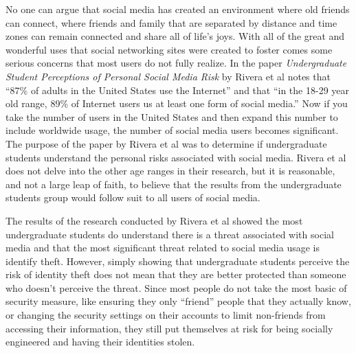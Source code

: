 \documentclass[conference]{IEEEtran}
\begin{document}
No one can argue that social media has created an environment where old friends can connect, where friends and family that are separated by distance and time zones can remain connected and share all of life’s joys. With all of the great and wonderful uses that social networking sites were created to foster comes some serious concerns that most users do not fully realize. In the paper \textit{Undergraduate Student Perceptions of Personal Social Media Risk} by Rivera et al notes that “87\% of adults in the United States use the Internet” and that “in the 18-29 year old range, 89\% of Internet users us at least one form of social media\cite{Rivera:2015:USP:2885990.2885998}.”  Now if you take the number of users in the United States and then expand this number to include worldwide usage, the number of social media users becomes significant. The purpose of the paper by Rivera et al was to determine if undergraduate students understand the personal risks associated with social media. Rivera et al does not delve into the other age ranges in their research, but it is reasonable, and not a large leap of faith, to believe that the results from the undergraduate students group would follow suit to all users of social media. 

The results of the research conducted by Rivera et al showed the most undergraduate students do understand there is a threat associated with social media and that the most significant threat related to social media usage is identify theft\cite{Rivera:2015:USP:2885990.2885998}.  However, simply showing that undergraduate students perceive the risk of identity theft does not mean that they are better protected than someone who doesn’t perceive the threat.  Since most people do not take the most basic of security measure, like ensuring they only “friend” people that they actually know, or changing the security settings on their accounts to limit non-friends from accessing their information, they still put themselves at risk for being socially engineered and having their identities stolen. 
\end{document}
